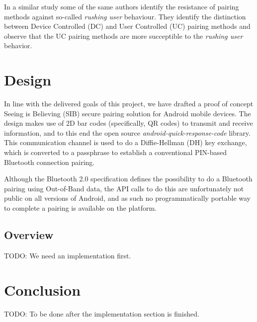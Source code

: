 \documentclass[conference, 12pt]{sty/IEEEtran}
\begin{document}
In a similar study \cite{kobsa2009serial} some of the same authors identify the resistance of pairing methods against so-called \textit{rushing user} behaviour.
They identify the distinction between Device Controlled (DC) and User Controlled (UC) pairing methods and observe that the UC pairing methods are more succeptible to the \textit{rushing user} behavior.

\section{Design}
\label{sec:design}
In line with the delivered goals of this project, we have drafted a proof of concept Seeing is Believing (SIB) secure pairing solution for Android mobile devices.
The design makes use of 2D bar codes (specifically, QR codes) to transmit and receive information, and to this end the open source \textit{android-quick-response-code}\cite{aqrc} library.
This communication channel is used to do a Diffie-Hellman (DH) key exchange, which is converted to a passphrase to establish a conventional PIN-based Bluetooth connection pairing.


Although the Bluetooth 2.0 specification defines the possibility to do a Bluetooth pairing using Out-of-Band data, the API calls to do this are unfortunately not public on all versions of Android, and as such no programmatically portable way to complete a pairing is available on the platform.

\subsection{Overview}
\label{ssec:overview}

TODO: We need an implementation first.

\section{Conclusion}
\label{sec:conclusion}

TODO: To be done after the implementation section is finished.



\end{document}
